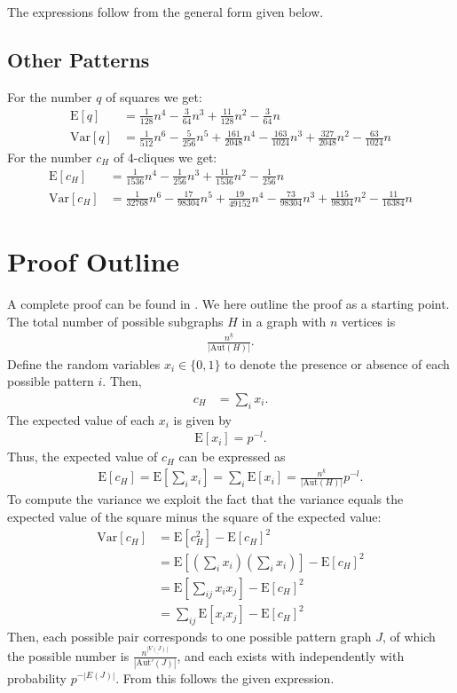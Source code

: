 \documentclass{article}
\begin{document}
The expressions follow from the general form given below. 

\subsection{Other Patterns}
For the number $q$ of squares we get:
\begin{align*}
  \mathrm{E}[q] &= \frac{1}{128}n^4 -\frac{3}{64}n^3
  +\frac{11}{128}n^2 -\frac{3}{64}n   \\
  \mathrm{Var}[q] &= \frac 1 {512} n^6 - \frac 5 {256} n^5 + \frac
         {161}{2048} n^4 - \frac{163}{1024}n^3 + \frac{327}{2048} n^2 -
         \frac{63}{1024}n 
\end{align*}
For the number $c_H$ of 4-cliques we get: 
\begin{align*}
  \mathrm{E}[c_H] &= \frac{1}{1536}n^4 -\frac{1}{256}n^3
  +\frac{11}{1536}n^2 -\frac{1}{256}n \\
  \mathrm{Var}[c_H] &= \frac{1}{32768}n^6 -\frac{17}{98304}n^5
  +\frac{19}{49152}n^4 -\frac{73}{98304}n^3 +\frac{115}{98304}n^2
  -\frac{11}{16384}n 
\end{align*}

\section{Proof Outline}
A complete proof can be found in \cite{gp6}.  We here outline the proof
as a starting point. The total number of possible subgraphs $H$ in a graph
with $n$ vertices is 
\begin{align*}
  \frac{n^{\underline{k}}}{|\mathrm{Aut}(H)|}.
\end{align*}
Define the random variables $x_i\in \{0,1\}$ to denote the
presence or absence of each possible pattern $i$.  
Then, 
\begin{align*}
  c_H &= \sum_i x_i.
\end{align*}
The expected value of each $x_i$ is given by
\begin{align*}
  \mathrm{E}[x_i] = p^{-l}.
\end{align*}
Thus, the expected value of $c_H$ can be expressed as
\begin{align*}
  \mathrm{E}[c_H] = \mathrm{E}[\sum_i x_i] = \sum_i \mathrm{E}[x_i]
  = \frac{n^{\underline{k}}}{|\mathrm{Aut}(H)|} p^{-l}.
\end{align*}
To compute the variance we exploit the fact that the variance equals the
expected value of the square minus the square of the expected value: 
\begin{align*}
  \mathrm{Var}[c_H] &= \mathrm{E}[c_H^2] - \mathrm{E}[c_H]^2 \\
  &= \mathrm{E}[(\sum_i x_i)(\sum_i x_i)] - \mathrm{E}[c_H]^2 \\
  &= \mathrm{E}[\sum_{ij} x_i x_j] - \mathrm{E}[c_H]^2 \\
  &= \sum_{ij} \mathrm{E}[x_i x_j] - \mathrm{E}[c_H]^2
\end{align*}
Then, each possible pair corresponds to one possible pattern graph $J$,
of which the possible number is
$\frac{n^{\underline{|V(J)|}}}{|\mathrm{Aut'}(J)|}$, and each exists
with independently with probability $p^{-|E(J)|}$.  From this follows
the given expression. 
\end{document}
